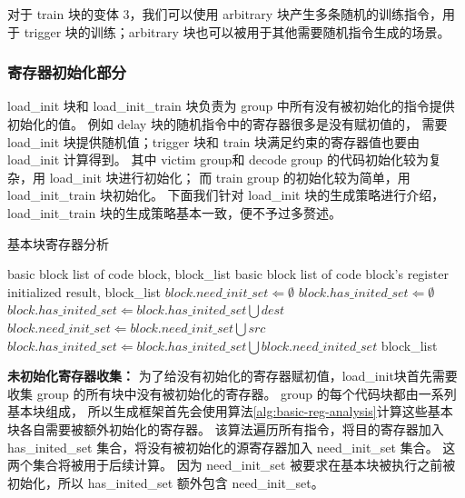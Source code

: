 对于 train 块的变体 3，我们可以使用 arbitrary 块产生多条随机的训练指令，用于 trigger 块的训练；arbitrary 块也可以被用于其他需要随机指令生成的场景。\par

\subsubsection{寄存器初始化部分}

load\_init 块和 load\_init\_train 块负责为 group 中所有没有被初始化的指令提供初始化的值。
例如 delay 块的随机指令中的寄存器很多是没有赋初值的，
需要 load\_init 块提供随机值；trigger 块和 train 块满足约束的寄存器值也要由 load\_init 计算得到。
其中 victim group和 decode group 的代码初始化较为复杂，用 load\_init 块进行初始化；
而 train group 的初始化较为简单，用 load\_init\_train 块初始化。
下面我们针对 load\_init 块的生成策略进行介绍，load\_init\_train 块的生成策略基本一致，便不予过多赘述。\par

\begin{algorithm}[!h]
    
    \caption{基本块寄存器分析}
    \label{alg:basic-reg-analysis}
    \renewcommand{\algorithmicrequire}{\textbf{Input:}}
    \renewcommand{\algorithmicensure}{\textbf{Output:}}
    
    \begin{algorithmic}[1]
        \REQUIRE basic block list of code block, block\_list  %
        \ENSURE  basic block list of code block's register initialized result, block\_list  %
            \STATE $block.need\_init\_set \Leftarrow \emptyset$
            \STATE $block.has\_inited\_set \Leftarrow \emptyset$
                    \STATE $block.has\_inited\_set \Leftarrow block.has\_inited\_set \bigcup dest$
                \ENDFOR
                        \STATE $block.need\_init\_set \Leftarrow block.need\_init\_set \bigcup src$
                    \ENDIF
                \ENDFOR
            \ENDFOR
            \STATE $block.has\_inited\_set \Leftarrow block.has\_inited\_set \bigcup block.need\_inited\_set$
        \ENDFOR
        \RETURN block\_list
    \end{algorithmic}
\end{algorithm}

\textbf{未初始化寄存器收集：}
为了给没有初始化的寄存器赋初值，load\_init块首先需要收集 group 的所有块中没有被初始化的寄存器。
group 的每个代码块都由一系列基本块组成，
所以生成框架首先会使用算法\ref{alg:basic-reg-analysis}计算这些基本块各自需要被额外初始化的寄存器。
该算法遍历所有指令，将目的寄存器加入 has\_inited\_set 集合，将没有被初始化的源寄存器加入 need\_init\_set 集合。
这两个集合将被用于后续计算。
因为 need\_init\_set 被要求在基本块被执行之前被初始化，所以 has\_inited\_set 额外包含  need\_init\_set。 \par

